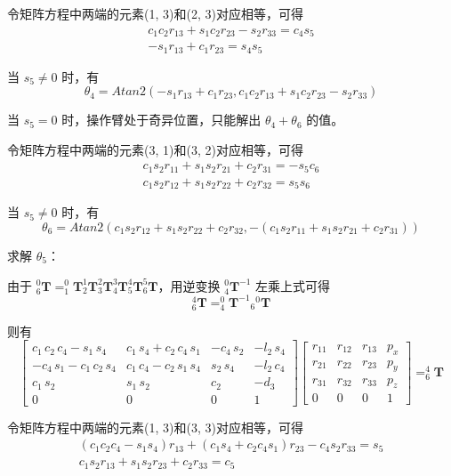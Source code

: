 \documentclass{homework}
\begin{document}
\begin{sol}
令矩阵方程中两端的元素(1, 3)和(2, 3)对应相等，可得
\begin{align*}
  c_1 c_2 r_{13} + s_1 c_2 r_{23} - s_2 r_{33} = c_4 s_5 \\
  - s_1 r_{13} + c_1 r_{23} = s_4 s_5
\end{align*}

当 $ s_5 \neq 0 $ 时，有
\[
  \theta_4 = Atan2(- s_1 r_{13} + c_1 r_{23}, c_1 c_2 r_{13} + s_1 c_2 r_{23} - s_2 r_{33}) 
\]

当 $ s_5 = 0 $ 时，操作臂处于奇异位置，只能解出 $ \theta_4 + \theta_6 $ 的值。

令矩阵方程中两端的元素(3, 1)和(3, 2)对应相等，可得
\begin{align*}
  c_1 s_2 r_{11} + s_1 s_2 r_{21} + c_2 r_{31} = - s_5 c_6 \\
  c_1 s_2 r_{12} + s_1 s_2 r_{22} + c_2 r_{32} = s_5 s_6
\end{align*}

当 $ s_5 \neq 0 $ 时，有
\[
  \theta_6 = Atan2(c_1 s_2 r_{12} + s_1 s_2 r_{22} + c_2 r_{32}, - (c_1 s_2 r_{11} + s_1 s_2 r_{21} + c_2 r_{31}))
\]

求解 $ \theta_5 $：

由于 $ _6^0\mathbf{T} = _1^0\mathbf{T} _2^1\mathbf{T} _3^2\mathbf{T} _4^3\mathbf{T} _5^4\mathbf{T} _6^5\mathbf{T} $，用逆变换 $ _4^0\mathbf{T}^{-1} $ 左乘上式可得
\[
  _6^4\mathbf{T} = _4^0\mathbf{T}^{-1} {_6}^0\mathbf{T}
\]

则有
\[
  \begin{bmatrix} 
    c_{1}\,c_{2}\,c_{4}-s_{1}\,s_{4} & c_{1}\,s_{4}+c_{2}\,c_{4}\,s_{1} & -c_{4}\,s_{2} & -l_{2}\,s_{4} \\ 
    -c_{4}\,s_{1}-c_{1}\,c_{2}\,s_{4} & c_{1}\,c_{4}-c_{2}\,s_{1}\,s_{4} & s_{2}\,s_{4} & -l_{2}\,c_{4} \\ 
    c_{1}\,s_{2} & s_{1}\,s_{2} & c_{2} & -d_{3} \\ 
    0 & 0 & 0 & 1
  \end{bmatrix}
  \begin{bmatrix} 
    r_{11} & r_{12} & r_{13} & p_x \\ 
    r_{21} & r_{22} & r_{23} & p_y \\ 
    r_{31} & r_{32} & r_{33} & p_z \\ 
    0 & 0 & 0 & 1
  \end{bmatrix} = _6^4\mathbf{T}
\]

令矩阵方程中两端的元素(1, 3)和(3, 3)对应相等，可得
\begin{align*}
  (c_1 c_2 c_4 - s_1 s_4) r_{13} + (c_1 s_4 + c_2 c_4 s_1) r_{23} - c_4 s_2 r_{33} = s_5 \\
  c_1 s_2 r_{13} + s_1 s_2 r_{23} + c_2 r_{33} = c_5
\end{align*}


\end{sol}
\end{document}
